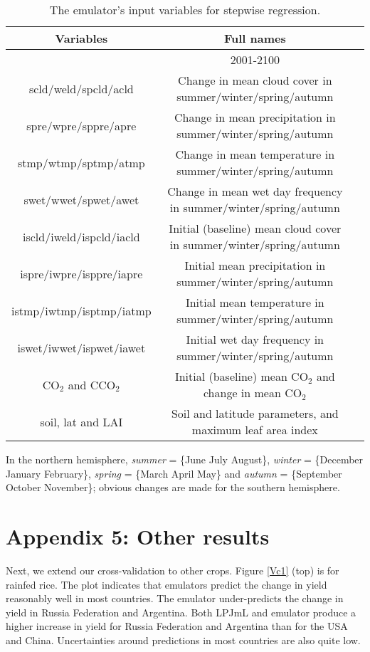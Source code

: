 \begin{table*}[!ht]
\footnotesize
\begin{center}
\caption{The emulator's input variables for stepwise regression.}\label{tt1}
\begin{tabular}{|c|cc|}
\hline
Variables& Full names&\\
\hline
&2001-2100  &\\
\hline
scld/weld/spcld/acld & Change in mean cloud cover in summer/winter/spring/autumn&\\
spre/wpre/sppre/apre & Change in mean precipitation in summer/winter/spring/autumn&\\
stmp/wtmp/sptmp/atmp & Change in mean temperature in summer/winter/spring/autumn &\\
swet/wwet/spwet/awet & Change in mean wet day frequency in summer/winter/spring/autumn &\\
iscld/iweld/ispcld/iacld & Initial (baseline) mean cloud cover in summer/winter/spring/autumn &\\
ispre/iwpre/isppre/iapre & Initial mean precipitation in summer/winter/spring/autumn &\\
istmp/iwtmp/isptmp/iatmp & Initial mean temperature in summer/winter/spring/autumn &\\
iswet/iwwet/ispwet/iawet & Initial wet day frequency in summer/winter/spring/autumn &\\
CO$_2$ and CCO$_2$ & Initial (baseline) mean CO$_2$ and change in mean CO$_2$ &\\
soil, lat and LAI & Soil and latitude parameters, and maximum leaf area index &\\
\hline
\end{tabular}
\end{center}
In the northern hemisphere, {\em summer} = \{June July August\}, {\em winter} = \{December January February\}, {\em spring} = \{March April May\} and {\em autumn} = \{September October November\}; obvious changes are made for the southern hemisphere.
\end{table*}

\section*{Appendix 5: Other results}
Next, we extend our cross-validation to other crops. 
Figure \ref{Vc1} (top) is for rainfed rice. The plot indicates that emulators predict the change in yield reasonably well in most countries. The emulator under-predicts the change in yield in Russia Federation and Argentina. Both LPJmL and emulator produce a higher increase in yield for Russia Federation and Argentina than for the USA and China. Uncertainties around predictions in most countries are also quite low. 

